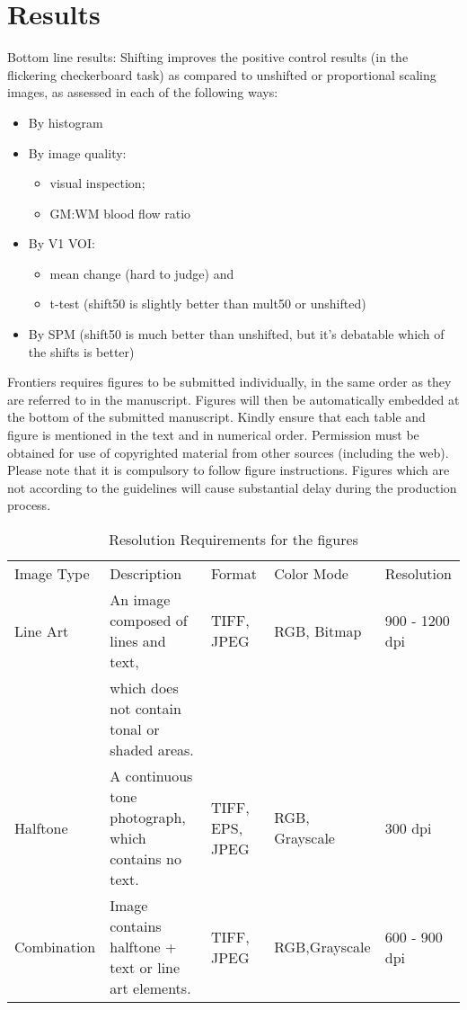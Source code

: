 \section{Results}

Bottom line results:  Shifting improves the positive control results (in the flickering checkerboard task) as compared to unshifted or proportional scaling images, as assessed in each of the following ways:
\begin{itemize}
\item By histogram
\item By image quality: 
  \begin{itemize}
  \item visual inspection;
  \item GM:WM blood flow ratio
  \end{itemize}
\item By V1 VOI: 
  \begin{itemize} 
    \item mean change (hard to judge) and 
    \item t-test (shift50 is slightly better than mult50 or unshifted)
  \end{itemize}
\item By SPM (shift50 is much better than unshifted, but it's debatable which of the shifts is better)
\end{itemize}


Frontiers requires figures to be submitted individually, in the same order as they are referred to in the manuscript. Figures will then be automatically embedded at the bottom of the submitted manuscript. Kindly ensure that each table and figure is mentioned in the text and in numerical order. Permission must be obtained for use of copyrighted material from other sources (including the web). Please note that it is compulsory to follow figure instructions. Figures which are not according to the guidelines will cause substantial delay during the production process.

\begin{table}
\caption{Resolution Requirements for the figures\label{Tab:02}}
\begin{tabular}{lllll}
Image Type & Description & Format & Color Mode & Resolution\\
Line Art & An image composed of lines and text,  & TIFF, JPEG & RGB, Bitmap & 900 - 1200 dpi\\
           & which does not contain tonal or shaded areas.& & &\\
           Halftone & A continuous tone photograph, which contains no text. & TIFF, EPS, JPEG & RGB, Grayscale & 300 dpi\\
Combination & Image contains halftone + text or line art elements. & TIFF, JPEG & RGB,Grayscale & 600 - 900 dpi\\
\end{tabular}
\end{table}

